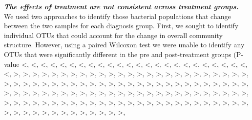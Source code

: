 \documentclass[12pt,]{article}
\begin{document}
\textbf{\emph{The effects of treatment are not consistent across
treatment groups.}} We used two approaches to identify those bacterial
populations that change between the two samples for each diagnosis
group. First, we sought to identify individual OTUs that could account
for the change in overall community structure. However, using a paired
Wilcoxon test we were unable to identify any OTUs that were
significantly different in the pre and post-treatment groups (P-value
\textless{}, \textless{}, \textless{}, \textless{}, \textless{},
\textless{}, \textless{}, \textless{}, \textless{}, \textless{},
\textless{}, \textless{}, \textless{}, \textless{}, \textless{},
\textless{}, \textless{}, \textless{}, \textless{}, \textless{},
\textless{}, \textless{}, \textless{}, \textless{}, \textless{},
\textgreater{}, \textgreater{}, \textgreater{}, \textgreater{},
\textgreater{}, \textgreater{}, \textgreater{}, \textgreater{},
\textgreater{}, \textgreater{}, \textgreater{}, \textgreater{},
\textgreater{}, \textgreater{}, \textgreater{}, \textgreater{},
\textgreater{}, \textgreater{}, \textgreater{}, \textgreater{},
\textgreater{}, \textgreater{}, \textgreater{}, \textgreater{},
\textgreater{}, \textgreater{}, \textgreater{}, \textgreater{},
\textgreater{}, \textgreater{}, \textgreater{}, \textgreater{},
\textgreater{}, \textgreater{}, \textgreater{}, \textgreater{},
\textgreater{}, \textgreater{}, \textgreater{}, \textgreater{},
\textgreater{}, \textgreater{}, \textgreater{}, \textgreater{},
\textgreater{}, \textgreater{}, \textgreater{}, \textgreater{},
\textgreater{}, \textgreater{}, \textgreater{}, \textgreater{},
\textgreater{}, \textgreater{}, \textgreater{}, \textgreater{},
\textgreater{}, \textgreater{}, \textgreater{}, \textgreater{},
\textgreater{}, \textgreater{}, \textgreater{}, \textgreater{},
\textgreater{}, \textgreater{}, \textgreater{}, \textgreater{},
\textgreater{}, \textgreater{}, \textgreater{}, \textgreater{},
\textgreater{}, \textgreater{}, \textgreater{}, \textgreater{},
\textgreater{}, \textgreater{}, \textgreater{}, \textgreater{},
\textgreater{}, \textgreater{}, \textgreater{}, \textgreater{},
\textgreater{}, \textgreater{}, \textgreater{}, \textgreater{},
\textgreater{}, \textgreater{}, \textgreater{}, \textgreater{},
\textgreater{}, \textgreater{}, \textgreater{}, \textgreater{},
\textgreater{}, \textgreater{}, \textgreater{}, \textgreater{},
\textgreater{}, \textgreater{}, \textgreater{}, \textgreater{},
\textgreater{}, \textgreater{}, \textgreater{}, \textgreater{},
\textgreater{}, \textgreater{}, \textgreater{}, \textgreater{},
\textgreater{}, \textgreater{}, \textgreater{}, \textgreater{},
\end{document}
